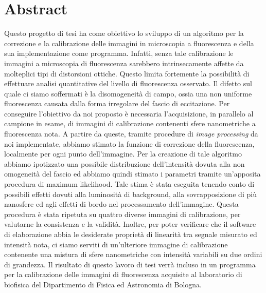 \clearpage{\pagestyle{empty}\cleardoublepage}

\chapter*{Abstract}


Questo progetto di tesi ha come obiettivo lo sviluppo di un algoritmo per la correzione e la calibrazione delle immagini in microscopia a fluorescenza e della sua implementazione come programma.
Infatti, senza tale calibrazione le immagini a microscopia di fluorescenza sarebbero intrinsecamente affette da molteplici tipi di distorsioni ottiche.
Questo limita fortemente la possibilità di effettuare analisi quantitative del livello di fluorescenza osservato.
Il difetto sul quale ci siamo soffermati è la disomogeneità di campo, ossia una non uniforme fluorescenza causata dalla forma irregolare del fascio di eccitazione.
Per conseguire l'obiettivo da noi proposto è necessaria l'acquisizione, in parallelo al campione in esame, di immagini di calibrazione contenenti sfere nanometriche a fluorescenza nota.
A partire da queste, tramite procedure di \textit{image processing} da noi implementate, abbiamo stimato la funzione di correzione della fluorescenza, localmente per ogni punto dell'immagine.
Per la creazione di tale algoritmo abbiamo ipotizzato una possibile distribuzione dell'intensità dovuta alla non omogeneità del fascio ed abbiamo quindi stimato i parametri tramite un'apposita procedura di maximum likelihood.
Tale stima è stata eseguita tenendo conto di possibili effetti dovuti alla luminosità di background, alla sovrapposizione di più nanosfere ed agli effetti di bordo nel processamento dell'immagine.
Questa procedura è stata ripetuta su quattro diverse immagini di calibrazione, per valutarne la consistenza e la validità.
Inoltre, per poter verificare che il software di elaborazione abbia le desiderate proprietà di linearità tra segnale misurato ed intensità nota, ci siamo serviti di un'ulteriore immagine di calibrazione contenente una mistura di sfere nanometriche con intensità variabili su due ordini di grandezza.
Il risultato di questo lavoro di tesi verrà incluso in un programma per la calibrazione delle immagini di fluorescenza acquisite al laboratorio di biofisica del Dipartimento di Fisica ed Astronomia di Bologna.
